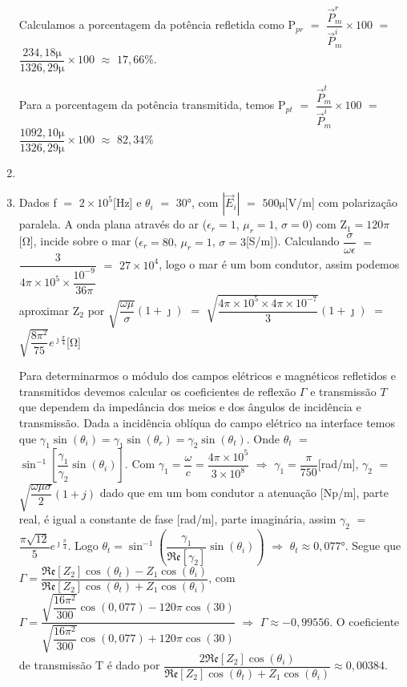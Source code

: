 \begin{enumerate}[1.]
Calculamos a porcentagem da potência refletida como P$_{pr}$ $=$ $\dfrac{\vec{P}_{m}^{r}}{\vec{P}_{m}^{i}} \times 100$ $=$ $\dfrac{234,18 \si{\micro}}{1326,29 \si{\micro}} \times 100$ $\approx$ $17,66$\%.

Para a porcentagem da potência transmitida, temos P$_{pt}$ $=$ $\dfrac{\vec{P}_{m}^{t}}{\vec{P}_{m}^{i}} \times 100$ $=$ $\dfrac{1092,10 \si{\micro}}{1326,29 \si{\micro}} \times 100$ $\approx$ $82,34$\%

\newpage

\item 

\item Dados f $=$ $2 \times 10^{5}$[\si{\hertz}] e $\theta_{i}$ $=$ $30$\si{\degree}, com $|\vec{E}_{i}|$ $=$ $500\si{\micro}$[\si{\volt/\meter}] com polarização paralela. A onda plana através do ar ($\epsilon_{r} = 1$, $\mu_{r} = 1$, $\sigma = 0$) com Z$_{1} = 120\pi$[\si{\ohm}], incide sobre o mar ($\epsilon_{r} = 80$, $\mu_{r} = 1$, $\sigma = 3$[\si{\siemens/\meter}]). Calculando $\dfrac{\sigma}{\omega\epsilon}$ $=$ $\dfrac{3}{4\pi \times 10^{5} \times \dfrac{10^{-9}}{36\pi}}$ $=$ $27 \times 10^{4}$, logo o mar é um bom condutor, assim podemos aproximar Z$_{2}$ por $\sqrt{\dfrac{\omega\mu}{\sigma}}(1 + \jmath)$ $=$ $\sqrt{\dfrac{4\pi \times 10^{5} \times 4\pi \times 10^{-7}}{3}}(1 + \jmath)$ $=$ $\sqrt{\dfrac{8\pi^{2}}{75}}e^{\jmath\frac{\pi}{4}}$[\si{\ohm}]

Para determinarmos o módulo dos campos elétricos e magnéticos refletidos e transmitidos devemos calcular os coeficientes de reflexão $\Gamma$ e transmissão $T$ que dependem da impedância dos meios e dos ângulos de incidência e transmissão. Dada a incidência oblíqua do campo elétrico na interface temos que $\gamma_{1}\sin(\theta_i) = \gamma_{1}\sin(\theta_{r}) = \gamma_{2}\sin(\theta_{t})$. Onde $\theta_{t}$ $=$ $\sin^{-1}\left[\dfrac{\gamma_{1}}{\gamma_{2}}\sin(\theta_{i})\right]$. Com $\gamma_{1} = \dfrac{\omega}{c} = \dfrac{4\pi \times 10^{5}}{3 \times 10^{8}}$ $\Rightarrow$ $\gamma_{1} = \dfrac{\pi}{750}$[\si{\radian/\meter}], $\gamma_{2}$ $=$ $\sqrt{\dfrac{\omega\mu\sigma}{2}}(1 + j)$ dado que em um bom condutor a atenuação [\si{\neper/\meter}], parte real, é igual a constante de fase [\si{\radian/\meter}], parte imaginária, assim $\gamma_{2}$ $=$ $\dfrac{\pi\sqrt{12}}{5}e^{\jmath\frac{\pi}{4}}$. Logo $\theta_{t} = \sin^{-1}\left(\dfrac{\gamma_{1}}{\mathfrak{Re}[\gamma_{2}]}\sin(\theta_{i})\right)$ $\Rightarrow$ $\theta_{t} \approx 0,077$\si{\degree}. Segue que $\Gamma = \dfrac{\mathfrak{Re}[Z_{2}]\cos(\theta_{t}) - Z_{1}\cos(\theta_{i})}{\mathfrak{Re}[Z_{2}]\cos(\theta_{t}) + Z_{1}\cos(\theta_{i})}$, com $\Gamma = \dfrac{\sqrt{\dfrac{16\pi^{2}}{300}}\cos(0,077) - 120\pi\cos(30)}{\sqrt{\dfrac{16\pi^{2}}{300}}\cos(0,077) + 120\pi\cos(30)}$ $\Rightarrow$ $\Gamma \approx -0,99556$. O coeficiente de transmissão T é dado por $\dfrac{2\mathfrak{Re}[Z_{2}]\cos(\theta_{i})}{\mathfrak{Re}[Z_{2}]\cos(\theta_{t}) + Z_{1}\cos(\theta_{i})} \approx 0,00384$.


\end{enumerate}
